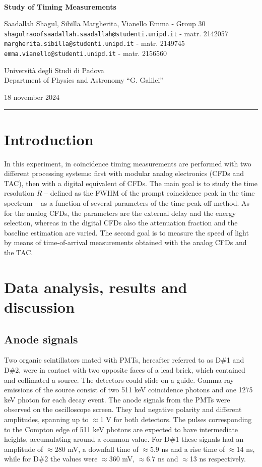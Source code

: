 \documentclass[a4paper]{article}
\title{\mytitle}
\author{\myauthor}
\date{\thedate}
\makeatletter
\newcommand{\mysubtitle}%
	{Study of Timing Measurements}
\newcommand{\myauthor}%
	{Saadallah Shagul, Sibilla Margherita, Vianello Emma - Group 30}
\newcommand{\myemail}%
	{{\texttt{shagulraoofsaadallah.saadallah@studenti.unipd.it}} - matr. 2142057\\      
        {\texttt{margherita.sibilla@studenti.unipd.it}} - matr. 2149745\\
	{\texttt{emma.vianello@studenti.unipd.it}} - matr. 2156560}
\newcommand{\thedate}%
	{18 november 2024}
\newcommand{\firstinstitute}%
	{Universit\`a degli Studi di Padova}
\newcommand{\secondinstitute}%
        {Department of Physics and Astronomy ``G. Galilei''}
\newcommand{\emphcolor}{gray}
\newcommand{\cover}{%
	\thispagestyle{plain}
	\begin{center}
		\Large\textbf{\textcolor{\emphcolor}{\mytitle}} \\
		\LARGE\textbf{\mysubtitle}
		\bigskip
		
		\normalsize\myauthor \\
		\small\myemail
		\medskip
		
		\normalsize\firstinstitute \\ 
		\secondinstitute
		\medskip
		
		\normalsize\thedate \\
	\end{center}%
}
\makeatother
\begin{document}
	
	
	\phantom{.}\vfill
	\cover
	
%		

	\begin{center}
		\rule{.9\textwidth}{0.4pt}%
	\end{center}
	
	\tableofcontents
	\phantom{.}\vfill\phantom{.}
    
        \thispagestyle{empty}
	\clearpage


\section{Introduction}

\setcounter{page}{1}
In this experiment, in coincidence timing measurements are performed with two different processing systems: first with modular analog electronics (CFDs and TAC), then with a digital equivalent of CFDs. 
The main goal is to study the time resolution $R$ -- defined as the FWHM of the prompt coincidence peak in the time spectrum -- as a function of several parameters of the time peak-off method. 
As for the analog CFDs, the parameters are the external delay and the energy selection, whereas in the digital CFDs also the attenuation fraction and the baseline estimation are varied. 
The second goal is to measure the speed of light by means of time-of-arrival measurements obtained with the analog CFDs and the TAC.

\section{Data analysis, results and discussion}

\subsection{Anode signals}
\hypertarget{2.1}{}
Two organic scintillators mated with PMTs, hereafter referred to as D\#1 and D\#2, were in contact with two opposite faces of a lead brick, which contained and collimated a  source. 
The detectors could slide on a guide. 
Gamma-ray emissions of the source consist of two 511 keV coincidence photons and one 1275 keV photon for each decay event. The anode signals from the PMTs were observed on the oscilloscope screen. They had negative polarity and different amplitudes, spanning up to $\approx$1 V for both detectors. The pulses corresponding to the Compton edge of 511 keV photons are expected to have intermediate heights, accumulating around a common value. For D\#1 these signals had an amplitude of $\approx$280 mV, a downfall time of $\approx$5.9 ns and a rise time of $\approx$14 ns, while for D\#2 the values were $\approx$360 mV, $\approx$6.7 ns and $\approx$13 ns respectively.
\end{document}
